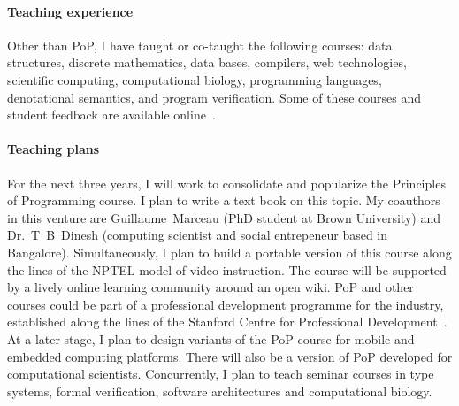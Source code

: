\documentclass[
9pt, 
]{article}
\begin{document}
\paragraph{Teaching experience}
Other than PoP, I have taught or co-taught the following
courses: data structures, discrete mathematics, data bases,
compilers, web technologies, scientific computing,
computational biology, programming languages, denotational
semantics, and program verification.  Some of these courses
and student feedback are available
online~\cite{choppella-courses}.

\paragraph{Teaching plans}
For the next three years, I will work to consolidate and
popularize the Principles of Programming course.  I plan to
write a text book on this topic.  My coauthors in this
venture are Guillaume~Marceau (PhD student at Brown
University) and Dr.~T~B~Dinesh (computing scientist and
social entrepeneur based in Bangalore).  Simultaneously, I
plan to build a portable version of this course along the
lines of the NPTEL model of video instruction.  The course
will be supported by a lively online learning community
around an open wiki.  PoP and other courses could be part of
a professional development programme for the industry,
established along the lines of the Stanford Centre for
Professional Development~\cite{scpd}.  At a later stage, I
plan to design variants of the PoP course for mobile and
embedded computing platforms.  There will also be a version
of PoP developed for computational scientists.
Concurrently, I plan to teach seminar courses in type
systems, formal verification, software architectures and
computational biology.

\end{document}
